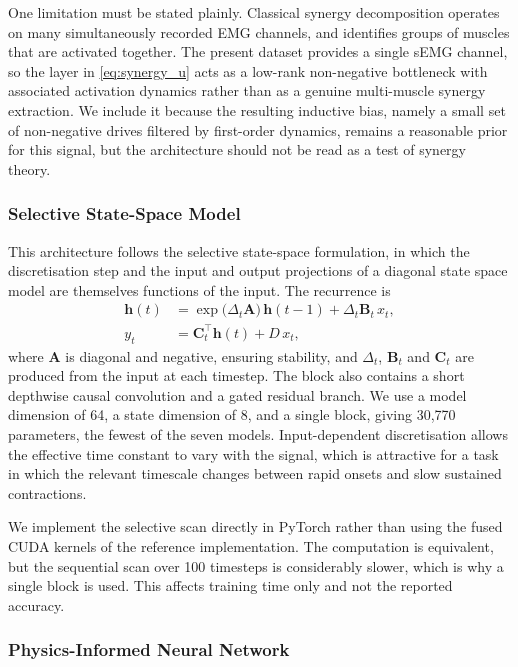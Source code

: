 One limitation must be stated plainly. Classical synergy decomposition operates
on many simultaneously recorded EMG channels, and identifies groups of muscles
that are activated together. The present dataset provides a single sEMG channel,
so the layer in \eqref{eq:synergy_u} acts as a low-rank non-negative bottleneck
with associated activation dynamics rather than as a genuine multi-muscle synergy
extraction. We include it because the resulting inductive bias, namely a small
set of non-negative drives filtered by first-order dynamics, remains a reasonable
prior for this signal, but the architecture should not be read as a test of
synergy theory.

\subsubsection{Selective State-Space Model}
\label{sec:mamba}

This architecture follows the selective state-space formulation, in which the
discretisation step and the input and output projections of a diagonal state
space model are themselves functions of the input. The recurrence is
\begin{align}
  \mathbf{h}(t) &= \exp\!\big(\Delta_t \mathbf{A}\big)\,\mathbf{h}(t-1)
                 + \Delta_t \mathbf{B}_t\, x_t, \label{eq:mamba_h} \\
  y_t &= \mathbf{C}_t^{\!\top}\mathbf{h}(t) + D\, x_t, \label{eq:mamba_y}
\end{align}
where $\mathbf{A}$ is diagonal and negative, ensuring stability, and
$\Delta_t$, $\mathbf{B}_t$ and $\mathbf{C}_t$ are produced from the input at each
timestep. The block also contains a short depthwise causal convolution and a
gated residual branch. We use a model dimension of 64, a state dimension of 8,
and a single block, giving 30{,}770 parameters, the fewest of the seven models.
Input-dependent discretisation allows the effective time constant to vary with
the signal, which is attractive for a task in which the relevant timescale
changes between rapid onsets and slow sustained contractions.

We implement the selective scan directly in PyTorch rather than using the fused
CUDA kernels of the reference implementation. The computation is equivalent, but
the sequential scan over 100 timesteps is considerably slower, which is why a
single block is used. This affects training time only and not the reported
accuracy.

\subsubsection{Physics-Informed Neural Network}
\label{sec:pinn}

